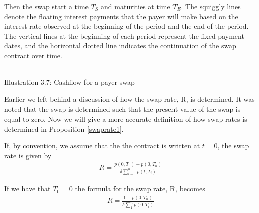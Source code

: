 Then the swap start a time $T_S$ and maturities at time $T_E$.
The squiggly lines denote the floating interest payments that the payer will make based on the interest rate observed 
at the beginning of the period and the end of the period. The vertical lines at the beginning of each period represent
the fixed payment dates, and the horizontal dotted line indicates the continuation of the swap contract over time.
\begin{center}
    \\[10pt] 
    Illustration 3.7: Cashflow for a payer swap 
\end{center}
Earlier we left behind a discussion of how the swap rate, R,  is determined. 
It was noted that the swap is determined such that the present value of
the swap is equal to zero. Now we will give a more accurate definition of how swap rates is determined in Proposition \ref{swaprate1}.
\begin{proposition}
    If, by convention, we assume that the the contract is written at $t=0$, 
    the swap rate is given by \cite{Bjork}
    \begin{align*}
        R = \frac{p(0,T_0)-p(0,T_n)}{\delta \sum_{i=1}^{n}p(t,T_i)}
    \end{align*} 
    \label{swaprate1}
\end{proposition}
\noindent 
If we have that $T_0=0$ the formula for the swap rate, R, becomes
\begin{align*}
    R= \frac{1-p(0,T_n)}{\delta \sum_{1}^{n}p(0,T_i)}
\end{align*}
\newpage
